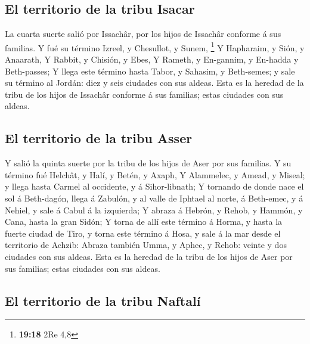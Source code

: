 \hypertarget{el-territorio-de-la-tribu-isacar}{%
\subsection{El territorio de la tribu
Isacar}\label{el-territorio-de-la-tribu-isacar}}

 La cuarta suerte salió por Issachâr, por los hijos de
Issachâr conforme á sus familias.  Y fué su término Izreel,
y Chesullot, y Sunem, \footnote{\textbf{19:18} 2Re 4,8}  Y
Hapharaim, y Sión, y Anaarath,  Y Rabbit, y Chisión, y
Ebes,  Y Rameth, y En-gannim, y En-hadda y Beth-passes;
 Y llega este término hasta Tabor, y Sahasim, y Beth-semes;
y sale su término al Jordán: diez y seis ciudades con sus aldeas.
 Esta es la heredad de la tribu de los hijos de Issachâr
conforme á sus familias; estas ciudades con sus aldeas.

\hypertarget{el-territorio-de-la-tribu-asser}{%
\subsection{El territorio de la tribu
Asser}\label{el-territorio-de-la-tribu-asser}}

 Y salió la quinta suerte por la tribu de los hijos de Aser
por sus familias.  Y su término fué Helchât, y Halí, y
Betén, y Axaph,  Y Alammelec, y Amead, y Miseal; y llega
hasta Carmel al occidente, y á Sihor-libnath;  Y tornando
de donde nace el sol á Beth-dagón, llega á Zabulón, y al valle de
Iphtael al norte, á Beth-emec, y á Nehiel, y sale á Cabul á la
izquierda;  Y abraza á Hebrón, y Rehob, y Hammón, y Cana,
hasta la gran Sidón;  Y torna de allí este término á Horma,
y hasta la fuerte ciudad de Tiro, y torna este término á Hosa, y sale á
la mar desde el territorio de Achzib:  Abraza también Umma,
y Aphec, y Rehob: veinte y dos ciudades con sus aldeas. 
Esta es la heredad de la tribu de los hijos de Aser por sus familias;
estas ciudades con sus aldeas.

\hypertarget{el-territorio-de-la-tribu-naftaluxed}{%
\subsection{El territorio de la tribu
Naftalí}\label{el-territorio-de-la-tribu-naftaluxed}}

